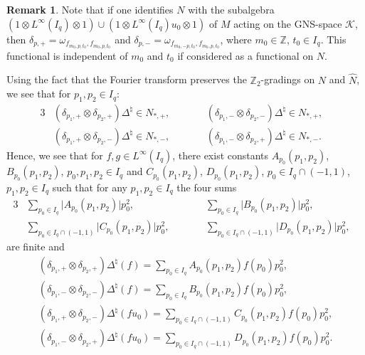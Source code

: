\documentclass[pdftex]{sigma}
\numberwithin{equation}{section}
\theoremstyle{definition}
\newtheorem{rmk}[thm]{Remark}
\begin{document}
\begin{rmk}\label{RmkFunctionals}
Note that if one identif\/ies $N$ with the subalgebra $(1 \otimes L^\infty(I_q) \otimes 1 )\cup (1 \otimes L^\infty(I_q)u_0 \otimes 1)$   of $M$ acting on the GNS-space $\mathcal{K}$, then $\delta_{p,+} = \omega_{f_{m_0, p, t_0}, f_{m_0, p, t_0}}$ and $\delta_{p,-} = \omega_{f_{m_0, -p, t_0}, f_{m_0, p, t_0}}$, where $m_0 \in \mathbb{Z}$, $t_0 \in I_q$. This functional is independent of $m_0$ and $t_0$ if consi\-de\-red as a functional on $N$.
\end{rmk}
Using the fact that the Fourier transform preserves the $\mathbb{Z}_2$-gradings on $N$ and $\hat{N}$, we see that for $p_1, p_2 \in I_q$:
\begin{alignat*}{3}
& (\delta_{p_1,+} \otimes \delta_{p_2,+}) \Delta^\natural  \in N_{\ast,+},  \qquad &&
(\delta_{p_1,-} \otimes \delta_{p_2,-}) \Delta^\natural  \in N_{\ast,+}, & \\
& (\delta_{p_1,+} \otimes \delta_{p_2,-}) \Delta^\natural  \in N_{\ast,-}, \qquad &&
(\delta_{p_1,-} \otimes \delta_{p_2,+}) \Delta^\natural  \in N_{\ast,-}.&
\end{alignat*}
 Hence, we see that for $f, g \in L^\infty(I_q)$, there exist constants $A_{p_0}(p_1, p_2)$, $B_{p_0}(p_1, p_2)$,  $p_0, p_1, p_2 \in I_q$ and $C_{p_0}(p_1, p_2)$, $D_{p_0}(p_1, p_2)$,  $p_0 \in I_q \cap (-1,1)$, $p_1, p_2 \in I_q$  such that for any $p_1, p_2 \in I_q$ the four sums
\begin{alignat*}{3}
& \sum_{p_0 \in I_q} \vert A_{p_0}(p_1, p_2)\vert p_0^2, \qquad && \sum_{p_0 \in I_q} \vert B_{p_0}(p_1, p_2)\vert p_0^2 , & \\
& \sum_{p_0 \in I_q\cap (-1,1)} \vert C_{p_0}(p_1, p_2)\vert p_0^2,\qquad && \sum_{p_0 \in I_q\cap (-1,1)} \vert D_{p_0}(p_1, p_2)\vert p_0^2,&
\end{alignat*}
are f\/inite and
\begin{gather}
(\delta_{p_1,+} \otimes \delta_{p_2,+}) \Delta^\natural (f)   =   \sum_{p_0
\in I_q} A_{p_0}(p_1, p_2) f(p_0) p_0^2,\label{EqnPrI}  \\
(\delta_{p_1,-} \otimes \delta_{p_2,-}) \Delta^\natural (f)   =   \sum_{p_0
\in I_q} B_{p_0}(p_1, p_2) f(p_0) p_0^2, \\
(\delta_{p_1,+} \otimes \delta_{p_2,-}) \Delta^\natural (f u_0)   =   \sum_{p_0
\in I_q \cap (-1,1)} C_{p_0}(p_1, p_2) f(p_0) p_0^2, \\
(\delta_{p_1,-} \otimes \delta_{p_2,+}) \Delta^\natural (f u_0)   =   \sum_{p_0
\in I_q \cap (-1,1)} D_{p_0}(p_1, p_2) f(p_0) p_0^2.\label{EqnPrIV}
\end{gather}
\end{document}
